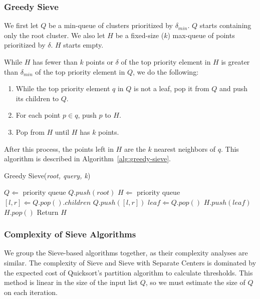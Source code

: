 \subsubsection{Greedy Sieve}
\label{subsubsec:methods:knn-search:greedy-search}

We first let $Q$ be a min-queue of clusters prioritized by $\delta_{min}$.
$Q$ starts containing only the root cluster.
We also let $H$ be a fixed-size ($k$) max-queue of points prioritized by $\delta$.
$H$ starts empty.

While $H$ has fewer than $k$ points or $\delta$ of the top priority element in $H$ is greater than $\delta_{min}$ of the top priority element in $Q$, we do the following:

\begin{enumerate}
\item While the top priority element $q$ in $Q$ is not a leaf, pop it from $Q$ and push its children to $Q$.
\item For each point $p \in q$, push $p$ to $H$. 
\item Pop from $H$ until $H$ has $k$ points. 
\end{enumerate}

After this process, the points left in $H$ are the $k$ nearest neighbors of $q$.
This algorithm is described in Algorithm~\ref{alg:greedy-sieve}.

\begin{algorithm} 
\caption{Greedy Sieve(\emph{root, query, k})} 
\label{alg:greedy-sieve} 
\begin{algorithmic}
    \STATE $Q \Leftarrow$ priority queue
    \STATE $Q.push(root)$
    \STATE $H \Leftarrow$ priority queue
            \STATE $[l, r] \Leftarrow Q.pop().children$
            \STATE $Q.push([l, r])$
        \ENDWHILE
        \STATE $leaf \Leftarrow Q.pop()$
        \STATE $H.push(leaf)$
            \STATE $H.pop()$
        \ENDWHILE
    \ENDWHILE
    \STATE Return $H$
\end{algorithmic}
\end{algorithm}


\subsubsection{Complexity of Sieve Algorithms}
\label{paragraph:methods:sieve-complexity}

We group the Sieve-based algorithms together, as their complexity analyses are similar.
The complexity of Sieve and Sieve with Separate Centers is dominated by the expected cost of Quicksort's partition algorithm to calculate thresholds.
This method is linear in the size of the input list $Q$, so we must estimate the size of $Q$ on each iteration. 

